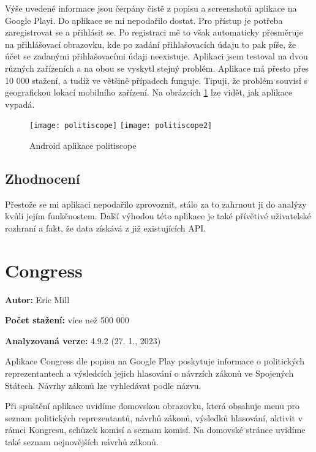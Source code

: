 \noindent Výše uvedené informace jsou čerpány čistě z popisu a screenshotů aplikace na Google Playi. Do aplikace se mi nepodařilo dostat. Pro přístup je potřeba zaregistrovat se a přihlásit se. Po registraci mě to však automaticky přesměruje na přihlášovací obrazovku, kde po zadání přihlašovacích údaju to pak píše, že účet se zadanými přihlašovacími údaji neexistuje. Aplikaci jsem testoval na dvou různých zařízeních a na obou se vyskytl stejný problém. Aplikace má přesto přes 10 000 stažení, a tudíž ve většině případech funguje. Tipuji, že problém souvisí s geografickou lokací mobilního zařízení. Na obrázcích \ref{fig:politoscope} lze vidět, jak aplikace vypadá.

\begin{figure}
	\centering

	\texttt{[image: politiscope]}
	\texttt{[image: politiscope2]}
	
	\caption{Android aplikace politiscope \cite{politiscope}}
	\label{fig:politoscope}
\end{figure}

\subsection{Zhodnocení}
Přestože se mi  aplikaci nepodařilo zprovoznit, stálo za to zahrnout ji do analýzy kvůli jejím funkčnostem. Další výhodou této aplikace je také přívětivé uživatelské rozhraní a fakt, že data získává z již existujících API.

\section{Congress}

\begin{description}
	\item \textbf{Autor:} Eric Mill
	\item \textbf{Počet stažení:} více než 500 000
	\item \textbf{Analyzovaná verze:} 4.9.2 (27. 1., 2023)
\end{description}

\noindent Aplikace Congress \cite{congress} dle popisu na Google Play poskytuje informace o politických reprezentantech a výsledcích jejich hlasování o návrzích zákonů ve Spojených Státech. Návrhy zákonů lze vyhledávat podle názvu.

Při spuštění aplikace uvidíme domovskou obrazovku, která obsahuje menu pro seznam politických reprezentantů, návrhů zákonů, výsledků hlasování, aktivit v rámci Kongresu, schůzek komisí \linebreak a seznam komisí. Na domovské stránce uvidíme také seznam nejnovějších návrhů zákonů. 

